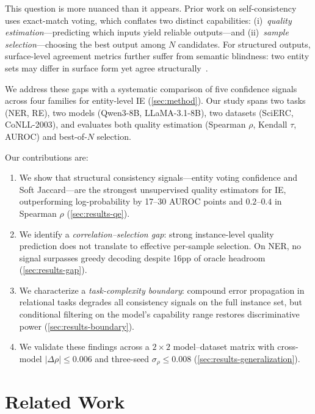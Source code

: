 \documentclass[11pt]{article}
\begin{document}
This question is more nuanced than it appears.
Prior work on self-consistency~\cite{wang2023selfconsistency} uses exact-match voting, which conflates two distinct capabilities: (i)~\emph{quality estimation}---predicting which inputs yield reliable outputs---and (ii)~\emph{sample selection}---choosing the best output among $N$ candidates.
For structured outputs, surface-level agreement metrics further suffer from semantic blindness: two entity sets may differ in surface form yet agree structurally~\cite{nedellec2026consistency}.

We address these gaps with a systematic comparison of five confidence signals across four families for entity-level IE (\cref{sec:method}).
Our study spans two tasks (NER, RE), two models (Qwen3-8B, LLaMA-3.1-8B), two datasets (SciERC, CoNLL-2003), and evaluates both quality estimation (Spearman $\rho$, Kendall $\tau$, AUROC) and best-of-$N$ selection.

Our contributions are:
\begin{enumerate}[nosep,leftmargin=*]
\item We show that structural consistency signals---entity voting confidence and Soft Jaccard---are the strongest unsupervised quality estimators for IE, outperforming log-probability by 17--30 AUROC points and $0.2$--$0.4$ in Spearman $\rho$ (\cref{sec:results-qe}).
\item We identify a \emph{correlation--selection gap}: strong instance-level quality prediction does not translate to effective per-sample selection. On NER, no signal surpasses greedy decoding despite 16pp of oracle headroom (\cref{sec:results-gap}).
\item We characterize a \emph{task-complexity boundary}: compound error propagation in relational tasks degrades all consistency signals on the full instance set, but conditional filtering on the model's capability range restores discriminative power (\cref{sec:results-boundary}).
\item We validate these findings across a $2{\times}2$ model--dataset matrix with cross-model $|\Delta\rho|{\le}0.006$ and three-seed $\sigma_\rho{\le}0.008$ (\cref{sec:results-generalization}).
\end{enumerate}

\section{Related Work}
\end{document}
